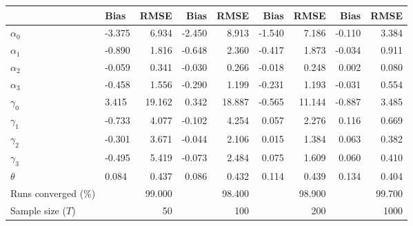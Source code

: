 
\begin{tabular}[t]{llrrrrrrr}
\toprule
  & Bias & RMSE & Bias & RMSE & Bias & RMSE & Bias & RMSE\\
\midrule
$\alpha_{0}$ & -3.375 & 6.934 & -2.450 & 8.913 & -1.540 & 7.186 & -0.110 & 3.384\\
$\alpha_{1}$ & -0.890 & 1.816 & -0.648 & 2.360 & -0.417 & 1.873 & -0.034 & 0.911\\
$\alpha_{2}$ & -0.059 & 0.341 & -0.030 & 0.266 & -0.018 & 0.248 & 0.002 & 0.080\\
$\alpha_{3}$ & -0.458 & 1.556 & -0.290 & 1.199 & -0.231 & 1.193 & -0.031 & 0.554\\
$\gamma_{0}$ & 3.415 & 19.162 & 0.342 & 18.887 & -0.565 & 11.144 & -0.887 & 3.485\\
$\gamma_{1}$ & -0.733 & 4.077 & -0.102 & 4.254 & 0.057 & 2.276 & 0.116 & 0.669\\
$\gamma_{2}$ & -0.301 & 3.671 & -0.044 & 2.106 & 0.015 & 1.384 & 0.063 & 0.382\\
$\gamma_{3}$ & -0.495 & 5.419 & -0.073 & 2.484 & 0.075 & 1.609 & 0.060 & 0.410\\
$\theta$ & 0.084 & 0.437 & 0.086 & 0.432 & 0.114 & 0.439 & 0.134 & 0.404\\
Runs converged (\%) &  & 99.000 &  & 98.400 &  & 98.900 &  & 99.700\\
Sample size ($T$) &  & 50 &  & 100 &  & 200 &  & 1000\\
\bottomrule
\end{tabular}
